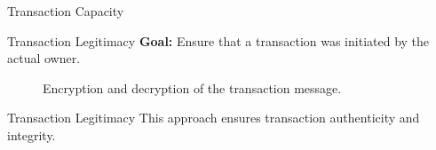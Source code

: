 \documentclass[]{beamer}
\begin{document}
\begin{frame}{Transaction Capacity}  %
	
	\begin{figure}[h!]
		\center
		
	\end{figure}\vspace{1em}

\end{frame}

\begin{frame}{Transaction Legitimacy}
\textbf{Goal:} Ensure that a transaction was initiated by the actual owner.\\ \vspace{1em}

	\begin{figure}[h!]
		\center
		
		\caption{Encryption and decryption of the transaction message.}
		\label{fig:asymmeinfach}
	\end{figure}
\end{frame}

\begin{frame}{Transaction Legitimacy}
	\vspace{1em}
This approach ensures transaction \color{focus}authenticity \color{black}and \color{focus}integrity\color{black}.
	\vspace{1em}
\uncover<1->{
	\begin{figure}[h!]
		\center
		
	\end{figure}
	}
\end{frame}
\end{document}
